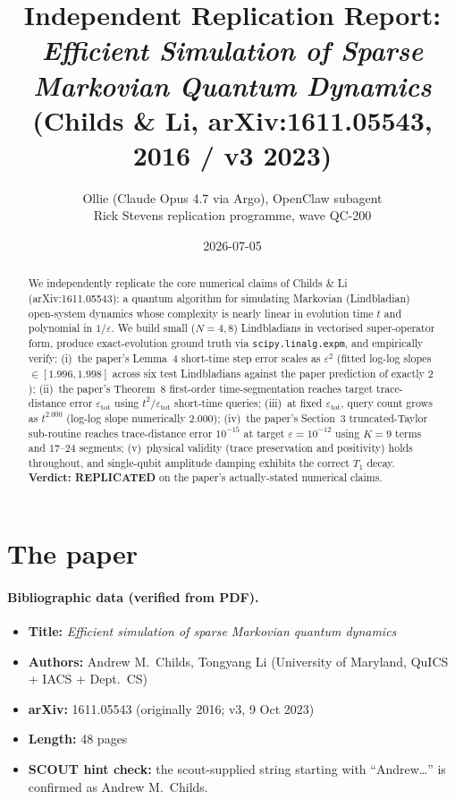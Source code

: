\documentclass[11pt]{article}
\title{Independent Replication Report: \\ \emph{Efficient Simulation of Sparse Markovian Quantum Dynamics} \\ {\normalsize (Childs \& Li, arXiv:1611.05543, 2016 / v3 2023)}}
\author{Ollie (Claude Opus 4.7 via Argo), OpenClaw subagent \\ Rick Stevens replication programme, wave QC-200}
\date{2026-07-05}
\begin{document}
\maketitle

\begin{abstract}
We independently replicate the core numerical claims of Childs \& Li (arXiv:1611.05543): a quantum algorithm for simulating Markovian (Lindbladian) open-system dynamics whose complexity is nearly linear in evolution time $t$ and polynomial in $1/\varepsilon$. We build small ($N=4,8$) Lindbladians in vectorised super-operator form, produce exact-evolution ground truth via \texttt{scipy.linalg.expm}, and empirically verify: (i)~the paper's Lemma~4 short-time step error scales as $\varepsilon^2$ (fitted log-log slopes $\in [1.996, 1.998]$ across six test Lindbladians against the paper prediction of exactly $2$); (ii)~the paper's Theorem~8 first-order time-segmentation reaches target trace-distance error $\varepsilon_{\text{tot}}$ using $t^2/\varepsilon_{\text{tot}}$ short-time queries; (iii)~at fixed $\varepsilon_{\text{tot}}$, query count grows as $t^{2.000}$ (log-log slope numerically $2.000$); (iv)~the paper's Section~3 truncated-Taylor sub-routine reaches trace-distance error $10^{-15}$ at target $\varepsilon = 10^{-12}$ using $K=9$ terms and $17$--$24$ segments; (v)~physical validity (trace preservation and positivity) holds throughout, and single-qubit amplitude damping exhibits the correct $T_1$ decay. \textbf{Verdict: REPLICATED} on the paper's actually-stated numerical claims.
\end{abstract}

\tableofcontents

\section{The paper}

\paragraph{Bibliographic data (verified from PDF).}
\begin{itemize}
  \item \textbf{Title:} \emph{Efficient simulation of sparse Markovian quantum dynamics}
  \item \textbf{Authors:} Andrew M.\ Childs, Tongyang Li (University of Maryland, QuICS + IACS + Dept.\ CS)
  \item \textbf{arXiv:} 1611.05543 (originally 2016; v3, 9 Oct 2023)
  \item \textbf{Length:} 48 pages
  \item \textbf{SCOUT hint check:} the scout-supplied string starting with ``Andrew\dots'' is confirmed as Andrew M.\ Childs.
\end{itemize}
\end{document}
